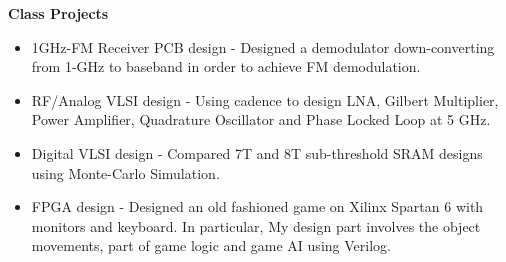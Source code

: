\documentclass[]{article}
\begin{document}
\noindent \textbf{Class Projects}
\begin{itemize}

\item 1GHz-FM Receiver PCB design -
Designed a demodulator down-converting from 1-GHz to baseband in order to
achieve FM demodulation.

\item RF/Analog VLSI design -
Using cadence to design LNA, Gilbert Multiplier, Power Amplifier, Quadrature
Oscillator and Phase Locked Loop at 5 GHz.

\item Digital VLSI design - 
Compared 7T and 8T sub-threshold SRAM designs using Monte-Carlo Simulation.

\item FPGA design - 
Designed an old fashioned game on Xilinx Spartan 6 with monitors and keyboard.
In particular, My design part involves the object movements, part of game logic
and game AI using Verilog.




\end{itemize}
\end{document}
